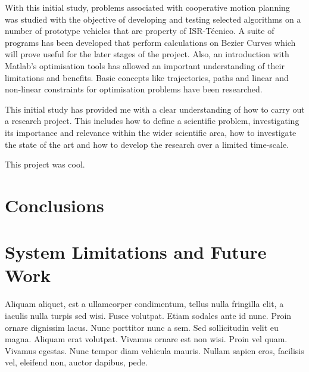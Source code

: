 \cleardoublepage%
\label{chap:conclusion}


\par With this initial study, problems associated with cooperative motion planning was studied with the objective of developing and testing selected algorithms on a number of prototype vehicles that are property of ISR-Técnico. A suite of programs has been developed that perform calculations on Bezier Curves which will prove useful for the later stages of the project. Also, an introduction with Matlab's optimisation tools has allowed an important understanding of their limitations and benefits. Basic concepts like trajectories, paths and linear and non-linear constraints for optimisation problems have been researched.
\par  This initial study has provided me with a clear understanding of how to carry out a research project. This includes how to define a scientific problem, investigating its importance and relevance within the wider scientific area, how to investigate the state of the art and how to develop the research over a limited time-scale.

 This project was cool.
\section{Conclusions}

\section{System Limitations and Future Work}
Aliquam aliquet, est a ullamcorper condimentum, tellus nulla fringilla elit, a iaculis nulla turpis sed wisi. Fusce volutpat. Etiam sodales ante id nunc. Proin ornare dignissim lacus. Nunc porttitor nunc a sem. Sed sollicitudin velit eu magna. Aliquam erat volutpat. Vivamus ornare est non wisi. Proin vel quam. Vivamus egestas. Nunc tempor diam vehicula mauris. Nullam sapien eros, facilisis vel, eleifend non, auctor dapibus, pede.
